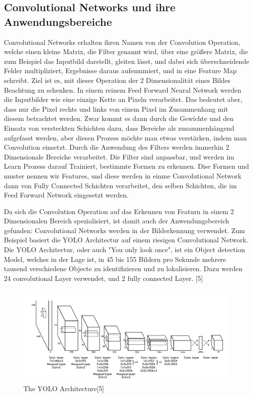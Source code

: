 \documentclass[12pt]{article}
\begin{document}
\subsection{Convolutional Networks und ihre Anwendungsbereiche}
Convolutional Networks erhalten ihren Namen von der Convolution Operation, welche einen kleine Matrix, die Filter genannt wird, über eine größere Matrix, die zum Beispiel das Inputbild darstellt, gleiten lässt, und dabei sich überschneidende Felder multipliziert, Ergebnisse daraus aufsummiert, und in eine Feature Map schreibt. Ziel ist es, mit dieser Operation der 2 Dimensionalität eines Bildes Beachtung zu schenken. In einem reinem Feed Forward Neural Network werden die Inputbilder wie eine einzige Kette an Pixeln verarbeitet. Das bedeutet aber, dass nur die Pixel rechts und links von einem Pixel im Zusammenhang mit diesem betrachtet werden. Zwar kommt es dann durch die Gewichte und den Einsatz von versteckten Schichten dazu, dass Bereiche als zusammenhängend aufgefasst werden, aber diesen Prozess möchte man etwas verstärken, indem man Convolution einsetzt. Durch die Anwendung des Filters werden immerhin 2 Dimensionale Bereiche verarbeitet. Die Filter sind anpassbar, und werden im Learn Prozess darauf Trainiert, bestimmte Formen zu erkennen. Dise Formen und muster nennen wir Features, und diese werden in einme Convolutional Network dann von Fully Connected Schichten verarbeitet, den selben Schichten, die im Feed Forward Network eingesetzt werden. 

Da sich die Convolution Operation auf das Erkennen von Featurn in einem 2 Dimensionalen Bereich spezialisiert, ist damit auch der Anwendungsbereich gefunden: Convolutional Networks werden in der Bilderkennung verwendet.
Zum Beispiel basiert die YOLO Architectur auf einem riesigen Convolutional Network. Die YOLO Architectur, oder auch "You only look once", ist ein Object detection Model, welches in der Lage ist, in 45 bis 155 Bildern pro Sekunde mehrere tausend verschiedene Objecte zu identifizieren und zu lokalisieren. Dazu werden 24 convolutional Layer verwendet, und 2 fully connected Layer. [5]

\begin{figure}[H]
\centering
\includegraphics[scale=0.38]{Images/BA_007_YOLO.png}
\caption{The YOLO Architecture[5]}
\label{The YOLO Architecture[5]}
\end{figure}
\end{document}
